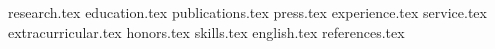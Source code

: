 \documentclass[9pt, a4paper]{awesome-cv}
\newcommand*{\sectiondir}{resume/}
\begin{document}
\newcommand*{\cvexptitle}[2]{
  \setlength\tabcolsep{0pt}
  \setlength{\extrarowheight}{0pt}
  \begin{tabular*}{\textwidth}{@{\extracolsep{\fill}} L{12.5cm} R{4.5cm}}
    \entrytitlestyle{#1} & \entrylocationstyle{#2} \\
  \end{tabular*}
}

\newcommand*{\cvexppos}[2]{
  \setlength\tabcolsep{0pt}
  \setlength{\extrarowheight}{0pt}
  \begin{tabular*}{\textwidth}{@{\extracolsep{\fill}} L{12.5cm} R{4.5cm}}
    \entrypositionstyle{#2} & \entrydatestyle{#1} \\
  \end{tabular*}
}

{research.tex}
{education.tex}
{publications.tex}
{press.tex}
{experience.tex}
{service.tex}
{extracurricular.tex}
{honors.tex}
{skills.tex}
{english.tex}
{references.tex}
\end{document}

